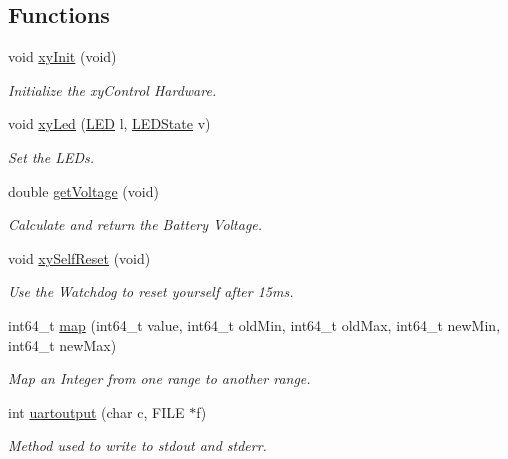 \subsection*{Functions}
\begin{DoxyCompactItemize}
\item 
void \hyperlink{group__xycontrol_ga2b3fb0734a2675e6dbdcb2c7665a708f}{xy\-Init} (void)
\begin{DoxyCompactList}\small\item\em Initialize the xy\-Control Hardware. \end{DoxyCompactList}\item 
void \hyperlink{group__xycontrol_ga783aead7f97dd462a9af56b7fc3b228f}{xy\-Led} (\hyperlink{group__xycontrol_gaadcb6002d2b42fdfe01490f730ab00a6}{L\-E\-D} l, \hyperlink{group__xycontrol_ga51a69e0b98357e170e63bc843e2fd1c0}{L\-E\-D\-State} v)
\begin{DoxyCompactList}\small\item\em Set the L\-E\-Ds. \end{DoxyCompactList}\item 
double \hyperlink{group__xycontrol_ga97874cf2a7f8e6964188b54fe85084a6}{get\-Voltage} (void)
\begin{DoxyCompactList}\small\item\em Calculate and return the Battery Voltage. \end{DoxyCompactList}\item 
void \hyperlink{group__xycontrol_ga26f242fc9cc1fb7dfdb78daae5579a63}{xy\-Self\-Reset} (void)
\begin{DoxyCompactList}\small\item\em Use the Watchdog to reset yourself after 15ms. \end{DoxyCompactList}\item 
int64\-\_\-t \hyperlink{group__xycontrol_gabcbffb9fdac0122e1d64b53119d03c63}{map} (int64\-\_\-t value, int64\-\_\-t old\-Min, int64\-\_\-t old\-Max, int64\-\_\-t new\-Min, int64\-\_\-t new\-Max)
\begin{DoxyCompactList}\small\item\em Map an Integer from one range to another range. \end{DoxyCompactList}\item 
int \hyperlink{group__xycontrol_ga7e2be90354ccc3af05947764858bc0b1}{uartoutput} (char c, F\-I\-L\-E $\ast$f)
\begin{DoxyCompactList}\small\item\em Method used to write to stdout and stderr. \end{DoxyCompactList}\item 

\end{DoxyCompactItemize}
